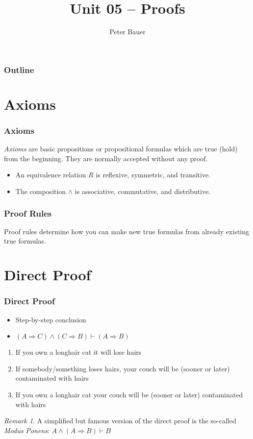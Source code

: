 \documentclass{beamer}
\title{Unit 05 – Proofs}
\author{Peter Bauer}
\date{} %
\theoremstyle{remark}
\newtheorem{remark}[theorem]{Remark}
\begin{document}
\frame{\titlepage}

\begin{frame}
	\frametitle{Outline}
	\tableofcontents
\end{frame}

\section{Axioms}

\begin{frame}
 \frametitle{Axioms}
 
\begin{definition}
 {\em Axioms} are basic propositions or propositional formulas which are true (hold) from the beginning. They are normally accepted without any proof.
\end{definition}

\begin{example}
\begin{itemize}
	\item An equivalence relation $R$ is reflexive, symmetric, and transitive.
	\item The composition $\land$ is associative, commutative, and distributive.
\end{itemize}
\end{example}
\end{frame}

\begin{frame}
\frametitle{Proof Rules}
Proof rules determine how you can make new true formulas from already existing true formulas.
\end{frame}

\section{Direct Proof}
\begin{frame}
\frametitle{Direct Proof}
\begin{itemize}
 	\item Step-by-step conclusion
	\item $(A \Rightarrow C) \land (C \Rightarrow B) \vdash (A \Rightarrow B)$
\end{itemize}
\pause
\begin{example}
 
\begin{enumerate}
 \item If you own a longhair cat it will lose hairs
 \pause
 \item If somebody/something loses hairs, your couch will be (sooner or later) contaminated with hairs
 \pause
 \item If you own a longhair cat your couch will be (sooner or later) contaminated with hairs
\end{enumerate}
\end{example}

\pause 

\begin{remark}
	A simplified but famous version of the direct proof is the so-called {\em Modus Ponens}:
	$A \land (A \Rightarrow B) \vdash B$
\end{remark}
\end{frame}
\end{document}
